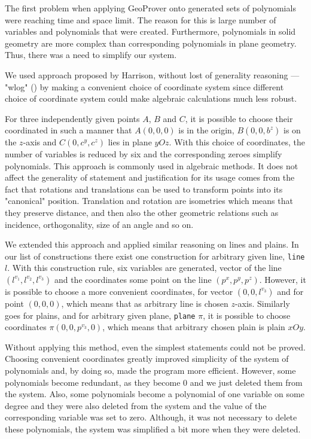 \documentclass[final,1p,times,authoryear]{elsarticle}
\begin{document}
The first problem when applying GeoProver onto generated sets of
polynomials were reaching time and space limit. The reason for this is
large number of variables and polynomials that were
created. Furthermore, polynomials in solid geometry are more complex
than corresponding polynomials in plane geometry. Thus, there was a
need to simplify our system.

We used approach proposed by Harrison, without lost of generality
reasoning --- "wlog" (\cite{harrison}) by making a convenient choice
of coordinate system since different choice of coordinate system could
make algebraic calculations much less robust.

For three independently given points $A$, $B$ and $C$, it is possible
to choose their coordinated in such a manner that $A(0, 0, 0)$ is in
the origin, $B(0, 0, b^z)$ is on the $z$-axis and $C(0, c^y, c^z)$
lies in plane $yOz$. With this choice of coordinates, the number of
variables is reduced by six and the corresponding zeroes simplify
polynomials. This approach is commonly used in algebraic methods. It
does not affect the generality of statement and justification for its
usage comes from the fact that rotations and translations can be used
to transform points into its "canonical" position. Translation and
rotation are isometries which means that they preserve distance, and
then also the other geometric relations such as incidence,
orthogonality, size of an angle and so on.

We extended this approach and applied similar reasoning on lines and
plains. In our list of constructions there exist one construction for
arbitrary given line, {\tt line} $l$. With this construction rule, six
variables are generated, vector of the line $(l^{v_1}, l^{v_2},
l^{v_3})$ and the coordinates some point on the line $(p^x, p^y,
p^z)$. However, it is possible to choose a more convenient
coordinates, for vector $(0, 0, l^{v_3})$ and for point $(0, 0, 0)$,
which means that as arbitrary line is chosen $z$-axis. Similarly goes
for plains, and for arbitrary given plane, {\tt plane} $\pi$, it is
possible to choose coordinates $\pi (0, 0, p^{v_3}, 0)$, which means
that arbitrary chosen plain is plain $xOy$.

Without applying this method, even the simplest statements could not
be proved. Choosing convenient coordinates greatly improved simplicity
of the system of polynomials and, by doing so, made the program more
efficient. However, some polynomials become redundant, as they become
$0$ and we just deleted them from the system. Also, some polynomials
become a polynomial of one variable on some degree and they were also
deleted from the system and the value of the corresponding variable
was set to zero. Although, it was not necessary to delete these
polynomials, the system was simplified a bit more when they were
deleted.
\end{document}
